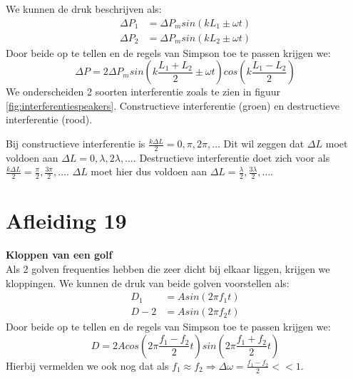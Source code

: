\documentclass[a4paper,kul]{kulakarticle} %
\begin{document}
We kunnen de druk beschrijven als:
\begin{align*}
	\Delta P_1 &= \Delta P_msin(kL_1\pm\omega t)\\
	\Delta P_2 &= \Delta P_msin(kL_2\pm\omega t)
\end{align*}
Door beide op te tellen en de regels van Simpson toe te passen krijgen we:
\begin{equation*}
	\Delta P = 2\Delta P_msin(k\frac{L_1+L_2}{2}\pm\omega t)cos(k\frac{L_1-L_2}{2})
\end{equation*}
We onderscheiden 2 soorten interferentie zoals te zien in figuur \ref{fig:interferentiespeakers}. Constructieve interferentie (groen) en destructieve interferentie (rood).

Bij constructieve interferentie is $\frac{k\Delta L}{2}=0,\pi,2\pi,\ldots$ Dit wil zeggen dat $\Delta L$ moet voldoen aan $\Delta L = 0,\lambda,2\lambda,\ldots$. Destructieve interferentie doet zich voor als $\frac{k\Delta L}{2}=\frac{\pi}{2},\frac{3\pi}{2},\ldots$. $\Delta L$ moet hier dus voldoen aan $\Delta L = \frac{\lambda}{2},\frac{3\lambda}{2},\ldots$.

\newpage
\section{Afleiding 19}
\textbf{Kloppen van een golf}\\
Als 2 golven frequenties hebben die zeer dicht bij elkaar liggen, krijgen we kloppingen. We kunnen de druk van beide golven voorstellen als:
\begin{align*}
	D_1&=Asin(2\pi f_1t)\\
	D-2&=Asin(2\pi f_2t)
\end{align*}
Door beide op te tellen en de regels van Simpson toe te passen krijgen we:
\begin{equation*}
	D=2Acos(2\pi\frac{f_1-f_2}{2}t)sin(2\pi\frac{f_1+f_2}{2}t)
\end{equation*}
Hierbij vermelden we ook nog dat als $f_1\approx f_2\Rightarrow\Delta\omega=\frac{f_1-f_2}{2}<<1$.


\newpage
\end{document}
